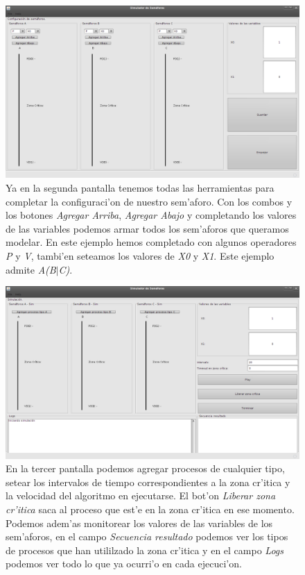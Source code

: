 \begin{figure}[h!]
\centering
 \includegraphics[scale=0.33,keepaspectratio=true]{./imagenes/semaforo/semaforos2.png}
 \caption{Ya en la segunda pantalla tenemos todas las herramientas para completar la configuraci'on de nuestro sem'aforo. Con los combos y los botones \emph{Agregar Arriba}, \emph{Agregar Abajo} y completando los valores de las variables podemos armar todos los sem'aforos que queramos modelar. En este ejemplo hemos completado con algunos operadores \emph{P} y \emph{V}, tambi'en seteamos los valores de \emph{X0} y \emph{X1}. Este ejemplo admite \emph{A(B}$|$\emph{C)}.}
\end{figure}

\begin{figure}[h!]
\centering
 \includegraphics[scale=0.33,keepaspectratio=true]{./imagenes/semaforo/semaforos3.png}
 \caption{En la tercer pantalla podemos agregar procesos de cualquier tipo,
setear los intervalos de tiempo correspondientes a la zona cr'itica y la
velocidad del algoritmo en ejecutarse. El bot'on \emph{Liberar zona cr'itica}
saca al proceso que est'e en la zona cr'itica en ese momento. Podemos adem'as
monitorear los valores de las variables de
los sem'aforos, en el campo \emph{Secuencia resultado} podemos ver los tipos de
procesos que han utililzado la zona cr'itica y en el campo \emph{Logs} podemos
ver todo lo que ya ocurri'o en cada ejecuci'on.}
\end{figure}
\newpage


